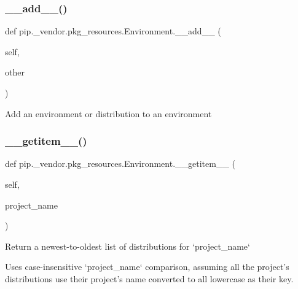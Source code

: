 \subsubsection{\texorpdfstring{\+\_\+\+\_\+add\+\_\+\+\_\+()}{\_\_add\_\_()}}
{\footnotesize\ttfamily def pip.\+\_\+vendor.\+pkg\+\_\+resources.\+Environment.\+\_\+\+\_\+add\+\_\+\+\_\+ (\begin{DoxyParamCaption}\item[{}]{self,  }\item[{}]{other }\end{DoxyParamCaption})}

\begin{DoxyVerb}Add an environment or distribution to an environment\end{DoxyVerb}
 \mbox{\label{classpip_1_1__vendor_1_1pkg__resources_1_1Environment_a3694329fc679e9f2c0a57d38f3815bba}} 
\subsubsection{\texorpdfstring{\+\_\+\+\_\+getitem\+\_\+\+\_\+()}{\_\_getitem\_\_()}}
{\footnotesize\ttfamily def pip.\+\_\+vendor.\+pkg\+\_\+resources.\+Environment.\+\_\+\+\_\+getitem\+\_\+\+\_\+ (\begin{DoxyParamCaption}\item[{}]{self,  }\item[{}]{project\+\_\+name }\end{DoxyParamCaption})}

\begin{DoxyVerb}Return a newest-to-oldest list of distributions for `project_name`

Uses case-insensitive `project_name` comparison, assuming all the
project's distributions use their project's name converted to all
lowercase as their key.\end{DoxyVerb}
 \mbox{\label{classpip_1_1__vendor_1_1pkg__resources_1_1Environment_ad026f479ac7031c92cf7cec14cef654f}} 
